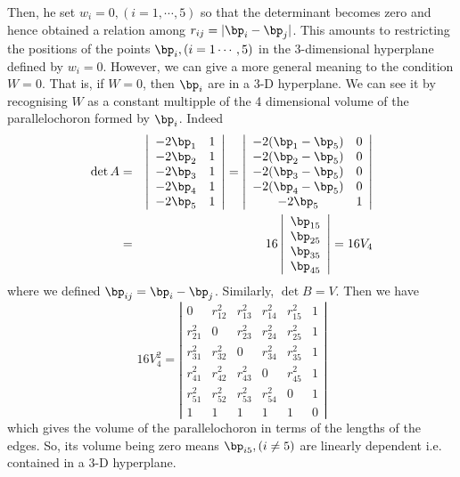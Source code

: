 \documentclass{article}
\begin{document}
Then, he set $w_i=0, (i=1,\cdots,5)$ so that the determinant becomes zero and hence obtained a relation among $r_{ij}=|\bp_{i} - \bp_{j}|$.
 This amounts to restricting the positions of the points $\bp_i, (i=1\cdots,5)$ in the 3-dimensional hyperplane defined by $w_i=0$. However, we can give a more general meaning to the condition $W=0$.
 That is, if $W=0$, then $\bp_i$ are in a 3-D hyperplane. We can see it by recognising $W$ as a constant multipple of the 4 dimensional volume of the parallelochoron formed by $\bp_i$. Indeed
\begin{eqnarray}
\det A & = &  \left|\begin{array}{cc}  -2\bp_1 & 1 \\ -2\bp_2 & 1 \\ -2\bp_3 & 1 \\ -2\bp_4 & 1 \\ -2\bp_5 &  1 \end{array}\right|
=\left|\begin{array}{cc}  -2(\bp_1-\bp_5) & 0 \\ -2(\bp_2-\bp_5) & 0 \\ -2(\bp_3-\bp_5) & 0 \\ -2(\bp_4 -\bp_5) & 0 \\ -2\bp_5 &  1 \\
\end{array}\right| \nonumber\\
 & = & 16\left|\begin{array}{c}  \bp_{15}  \\ \bp_{25} \\ \bp_{35} \\ \bp_{45} 
\end{array}\right| 
=16V_4
\end{eqnarray}
where we defined $\bp_{ij} = \bp_i -\bp_j$. Similarly, $\det B = V$. Then we have
\begin{equation}
\label{eq:vol_det}
16V_4^2 = \left|\begin{array}{cccccc}0 & r_{12}^2 & r_{13}^2 & r_{14}^2 & r_{15}^2 & 1 \\r_{21}^2 & 0 & r_{23}^2 & r_{24}^2 & r_{25}^2 & 1 \\r_{31}^2 & r_{32}^2 & 0 & r_{34}^2 & r_{35}^2 & 1 \\r_{41}^2 & r_{42}^2 & r_{43}^2 & 0 & r_{45}^2 & 1 \\r_{51}^2 & r_{52}^2 & r_{53}^2 & r_{54}^2 & 0 & 1 \\1 & 1 & 1 & 1 & 1 & 0  \end{array}\right|
\end{equation}
which gives the volume of the parallelochoron in terms of the lengths of the edges. So, its volume being zero means $\bp_{i5},(i\ne5)$ are linearly dependent i.e. contained in a 3-D hyperplane.
\end{document}

